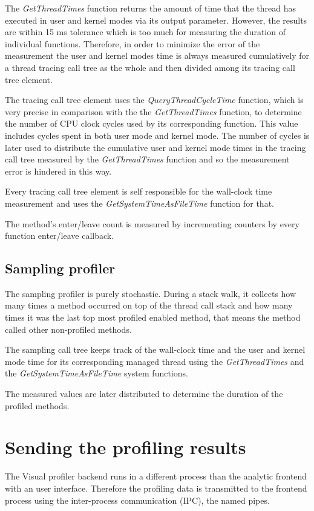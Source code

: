 The \textit{GetThreadTimes} function returns the amount of time that the thread has executed in user and kernel modes via its output parameter. However, the results are within 15 ms tolerance which is too much for measuring the duration of individual functions. Therefore, in order to minimize the error of the measurement the user and kernel modes time is always measured cumulatively for a thread tracing call tree as the whole and then divided among its tracing call tree element. 

The tracing call tree element uses the \textit{QueryThreadCycleTime} function, which is very precise in comparison with the the \textit{GetThreadTimes} function, to determine the number of CPU clock cycles used by its corresponding function. This value includes cycles spent in both user mode and kernel mode. The number of cycles is later used to distribute the cumulative user and kernel mode times in the tracing call tree measured by the \textit{GetThreadTimes} function and so the measurement error is hindered in this way.

Every tracing call tree element is self responsible for the wall-clock time measurement and uses the \textit{GetSystemTimeAsFileTime} function for that.

The method's enter/leave count is measured by incrementing counters by every function enter/leave callback.

\subsection{Sampling profiler}
The sampling profiler is purely stochastic. During a stack walk, it collects how many times a method occurred on top of the thread call stack and how many times it was the last top most profiled enabled method, that means the method called other non-profiled methods.

The sampling call tree keeps track of the wall-clock time and the user and kernel mode time for its corresponding managed thread using the \textit{GetThreadTimes} and the \textit{GetSystemTimeAsFileTime} system functions.

The measured values are later distributed to determine the duration of the profiled methods.

\section{Sending the profiling results}
The Visual profiler backend runs in a different process than the analytic frontend with an user interface. Therefore the profiling data is transmitted to the frontend process using the inter-process communication (IPC), the named pipes. 

